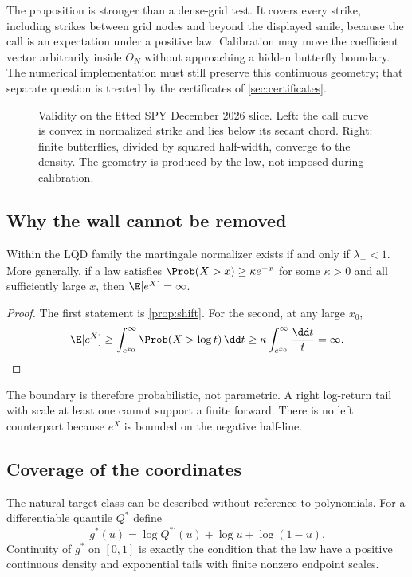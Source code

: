 The proposition is stronger than a dense-grid test.  It covers every strike,
including strikes between grid nodes and beyond the displayed smile, because
the call is an expectation under a positive law.  Calibration may move the
coefficient vector arbitrarily inside $\Theta_N$ without approaching a hidden
butterfly boundary.  The numerical implementation must still preserve this
continuous geometry; that separate question is treated by the certificates
of \cref{sec:certificates}.

\begin{figure}[htbp]
\centering
{}
\caption{Validity on the fitted SPY December 2026 slice.  Left: the call
curve is convex in normalized strike and lies below its secant chord.  Right:
finite butterflies, divided by squared half-width, converge to the density.
The geometry is produced by the law, not imposed during calibration.}
\label{fig:butterfly}
\end{figure}

\subsection{Why the wall cannot be removed}

\begin{proposition}
\label{prop:wall}
Within the LQD family the martingale normalizer exists if and only if
$\lambda_+<1$.  More generally, if a law satisfies
$\Prob(X>x)\ge\kappa e^{-x}$ for some $\kappa>0$ and all sufficiently large
$x$, then $\E[e^X]=\infty$.
\end{proposition}

\begin{proof}
The first statement is \cref{prop:shift}.  For the second, at any large
$x_0$,
\[
\E[e^X]\ge\int_{e^{x_0}}^\infty\Prob(X>\log t)\,\dd t
\ge\kappa\int_{e^{x_0}}^\infty\frac{\dd t}{t}=\infty.
\]
\end{proof}

The boundary is therefore probabilistic, not parametric.  A right log-return
tail with scale at least one cannot support a finite forward.  There is no
left counterpart because $e^X$ is bounded on the negative half-line.

\subsection{Coverage of the coordinates}

The natural target class can be described without reference to polynomials.
For a differentiable quantile $Q^*$ define
\[
g^*(u)=\log Q^{*\prime}(u)+\log u+\log(1-u).
\]
Continuity of $g^*$ on $[0,1]$ is exactly the condition that the law have a
positive continuous density and exponential tails with finite nonzero endpoint
scales.

